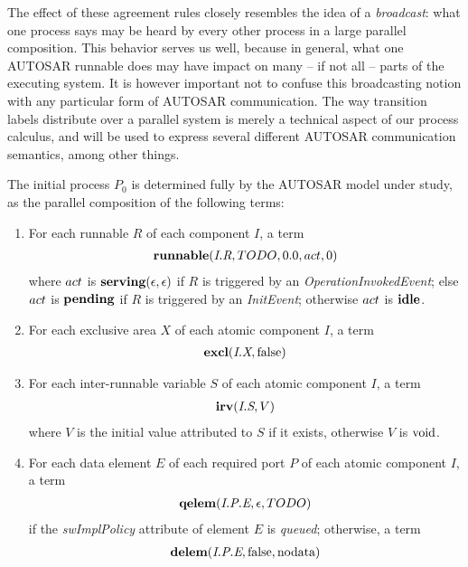 \documentclass[twocolumn]{article}
\begin{document}
The effect of these agreement rules closely resembles the idea of a \emph{broadcast}: what one process says may be heard by every other process in a large parallel composition. This behavior serves us well, because in general, what one AUTOSAR runnable does may have impact on many -- if not all -- parts of the executing system. It is however important not to confuse this broadcasting notion with any particular form of AUTOSAR communication. The way transition labels distribute over a parallel system is merely a technical aspect of our process calculus, and will be used to express several different AUTOSAR communication semantics, among other things.

The initial process $P_0$ is determined fully by the AUTOSAR model under study, as the parallel composition of the following terms:
\begin{enumerate}

\item For each runnable $R$ of each component $I$, a term
\[
\begin{array}{c}
	\runnable{\Tr{R}{I}}{TODO}{0.0}{\Act}{0}
\end{array}
\]
where $\Act$ is $\serving{\epsilon}{\epsilon}$ if $R$ is triggered by an \emph{OperationInvokedEvent}; else $\Act$ is $\Tpending$ if $R$ is triggered by an \emph{InitEvent}; otherwise $\Act$ is $\Tidle$.

\item For each exclusive area $X$ of each atomic component $I$, a term
\[
\begin{array}{c}
	\excl{\Tx{X}{I}}{\Tfalse}
\end{array}
\]

\item For each inter-runnable variable $S$ of each atomic component $I$, a term
\[
\begin{array}{c}
	\irv{\Ts{S}{I}}{V}
\end{array}
\]
where $V$ is the initial value attributed to $S$ if it exists, otherwise $V$ is $\Tvoid$.

\item For each data element $E$ of each required port $P$ of each atomic component $I$, a term
\[
\begin{array}{c}
	\qelem{\Tep{E}{P}{I}}{\epsilon}{TODO}
\end{array}
\]
if the \emph{swImplPolicy} attribute of element $E$ is \emph{queued}; otherwise, a term
\[
\begin{array}{c}
	\delem{\Tep{E}{P}{I}}{\Tfalse}{\text{nodata}}
\end{array}
\]


\end{enumerate}
\end{document}
